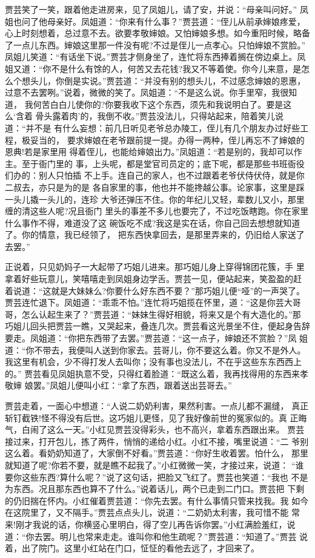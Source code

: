 贾芸笑了一笑，跟着他走进房来，见了凤姐儿，请了安，并说：“母亲叫问好。”
凤姐也问了他母亲好。凤姐道：“你来有什么事？”贾芸道：“侄儿从前承婶娘疼爱，
心上时刻想着，总过意不去。欲要孝敬婶娘。又怕婶娘多想。如今重阳时候，略备
了一点儿东西。婶娘这里那一件没有呢?不过是侄儿一点孝心。只怕婶娘不赏脸。”
凤姐儿笑道：“有话坐下说。”贾芸才侧身坐了，连忙将东西捧着搁在傍边桌上。凤
姐又道：“你不是什么有馀的人，何苦又去花钱?我又不等着使。你今儿来意，是怎
么个想头儿，你倒是实说。”贾芸道：“并没有别的想头儿，不过感念婶娘的恩惠，
过意不去罢咧。”说着，微微的笑了。凤姐道：“不是这么说。你手里窄，我很知道，
我何苦白白儿使你的?你要我收下这个东西，须先和我说明白了。要是这么‘含着
骨头露着肉’的，我倒不收。”贾芸没法儿，只得站起来，陪着笑儿说道：“并不是
有什么妄想：前几日听见老爷总办陵工，侄儿有几个朋友办过好些工程，极妥当的，
要求婶娘在老爷跟前提一提。办得一两种，侄儿再忘不了婶娘的恩典!若是家里用
得着侄儿，也能给婶娘出力。”凤姐道：“若是别的，我却可以作主。至于衙门里的
事，上头呢，都是堂官司员定的；底下呢，都是那些书班衙役们办的：别人只怕插
不上手。连自己的家人，也不过跟着老爷伏侍伏侍，就是你二叔去，亦只是为的是
各自家里的事，他也并不能搀越公事。论家事，这里是踩一头儿撬一头儿的，连珍
大爷还弹压不住。你的年纪儿又轻，辈数儿又小，那里缠的清这些人呢?况且衙门
里头的事差不多儿也要完了，不过吃饭瞎跑。你在家里什么事作不得，难道没了这
碗饭吃不成?我这是实在话，你自己回去想想就知道了。你的情意，我已经领了，
把东西快拿回去，是那里弄来的，仍旧给人家送了去罢。”

正说着，只见奶妈子一大起带了巧姐儿进来。那巧姐儿身上穿得锦团花簇，手
里拿着好些玩意儿，笑嘻嘻走到凤姐身边学舌。贾芸一见，便站起来，笑盈盈的赶
着说道：“这就是大妹妹么?你要什么好东西不要？”那巧姐儿便“哑”的一声哭了。
贾芸连忙退下。凤姐道：“乖乖不怕。”连忙将巧姐揽在怀里，道：“这是你芸大哥
哥，怎么认起生来了？”贾芸道：“妹妹生得好相貌，将来又是个有大造化的。”那
巧姐儿回头把贾芸一瞧，又哭起来，叠连几次。贾芸看这光景坐不住，便起身告辞
要走。凤姐道：“你把东西带了去罢。”贾芸道：“这一点子，婶娘还不赏脸？”凤
姐道：“你不带去，我便叫人送到你家去。芸哥儿，你不要这么着。你又不是外人。
我这里有机会，少不得打发人去叫你；没有事也没法儿，不在乎这些东东西西上的。”
贾芸看见凤姐执意不受，只得红着脸道：“既这么着，我再找得用的东西来孝敬婶
娘罢。”凤姐儿便叫小红：“拿了东西，跟着送出芸哥去。”

贾芸走着，一面心中想道：“人说二奶奶利害，果然利害。一点儿都不漏缝，
真正斩钉截铁!怪不得没有后世。这巧姐儿更怪，见了我好像前世的冤家似的。真
正晦气，白闹了这么一天。”小红见贾芸没得彩头，也不高兴，拿着东西跟出来。
贾芸接过来，打开包儿，拣了两件，悄悄的递给小红。小红不接，嘴里说道：“二
爷别这么着。看奶奶知道了，大家倒不好看。”贾芸道：“你好生收着罢。怕什么，
那里就知道了呢?你若不要，就是瞧不起我了。”小红微微一笑，才接过来，说道：
“谁要你这些东西?算什么呢？”说了这句话，把脸又飞红了。贾芸也笑道：“我也
不是为东西。况且那东西也算不了什么。”说着话儿，两个已走到二门口。贾芸把
下剩的仍旧揣在怀内。小红催着贾芸道：“你先去罢。有什么事情只管来找我。我
如今在这院里了，又不隔手。”贾芸点点头儿，说道：“二奶奶太利害，我可惜不能
常来!刚才我说的话，你横竖心里明白，得了空儿再告诉你罢。”小红满脸羞红，说
道：“你去罢。明儿也常来走走。谁叫你和他生疏呢？”贾芸道：“知道了。”贾芸
说着，出了院门。这里小红站在门口，怔怔的看他去远了，才回来了。

